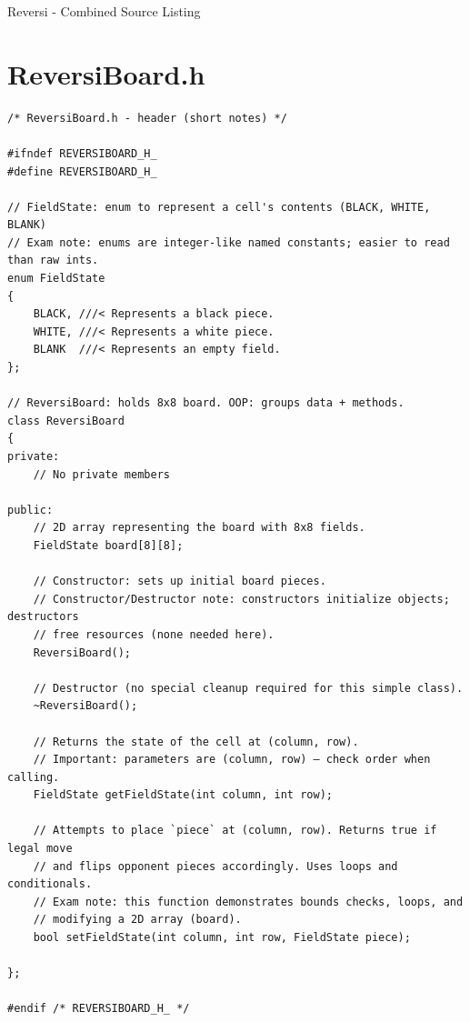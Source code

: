 \documentclass[11pt]{article}
\begin{document}
\begin{center}
  {\LARGE Reversi - Combined Source Listing}
  \\[6pt]
\end{center}
\vspace{1pt}

\section*{ReversiBoard.h}
\begin{lstlisting}
/* ReversiBoard.h - header (short notes) */

#ifndef REVERSIBOARD_H_
#define REVERSIBOARD_H_

// FieldState: enum to represent a cell's contents (BLACK, WHITE, BLANK)
// Exam note: enums are integer-like named constants; easier to read than raw ints.
enum FieldState
{
	BLACK, ///< Represents a black piece.
	WHITE, ///< Represents a white piece.
	BLANK  ///< Represents an empty field.
};

// ReversiBoard: holds 8x8 board. OOP: groups data + methods.
class ReversiBoard
{
private:
	// No private members

public:
	// 2D array representing the board with 8x8 fields.
	FieldState board[8][8];

	// Constructor: sets up initial board pieces.
	// Constructor/Destructor note: constructors initialize objects; destructors
	// free resources (none needed here).
	ReversiBoard();

	// Destructor (no special cleanup required for this simple class).
	~ReversiBoard();

	// Returns the state of the cell at (column, row).
	// Important: parameters are (column, row) — check order when calling.
	FieldState getFieldState(int column, int row);

	// Attempts to place `piece` at (column, row). Returns true if legal move
	// and flips opponent pieces accordingly. Uses loops and conditionals.
	// Exam note: this function demonstrates bounds checks, loops, and
	// modifying a 2D array (board).
	bool setFieldState(int column, int row, FieldState piece);

};

#endif /* REVERSIBOARD_H_ */
\end{lstlisting}
\end{document}

